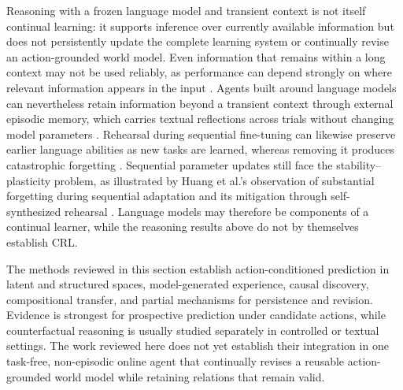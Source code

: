 \documentclass[10pt,journal,compsoc]{IEEEtran}
\begin{document}
Reasoning with a frozen language model and transient context is not itself continual learning: it supports inference over currently available information but does not persistently update the complete learning system or continually revise an action-grounded world model.
Even information that remains within a long context may not be used reliably, as performance can depend strongly on where relevant information appears in the input \cite{liu2024}.
Agents built around language models can nevertheless retain information beyond a transient context through external episodic memory, which carries textual reflections across trials without changing model parameters \cite{shinn2023}.
Rehearsal during sequential fine-tuning can likewise preserve earlier language abilities as new tasks are learned, whereas removing it produces catastrophic forgetting \cite{scialom2022}.
Sequential parameter updates still face the stability--plasticity problem, as illustrated by Huang et al.'s observation of substantial forgetting during sequential adaptation and its mitigation through self-synthesized rehearsal \cite{huang2024}.
Language models may therefore be components of a continual learner, while the reasoning results above do not by themselves establish CRL.

The methods reviewed in this section establish action-conditioned prediction in latent and structured spaces, model-generated experience, causal discovery, compositional transfer, and partial mechanisms for persistence and revision.
Evidence is strongest for prospective prediction under candidate actions, while counterfactual reasoning is usually studied separately in controlled or textual settings.
The work reviewed here does not yet establish their integration in one task-free, non-episodic online agent that continually revises a reusable action-grounded world model while retaining relations that remain valid.
\end{document}
